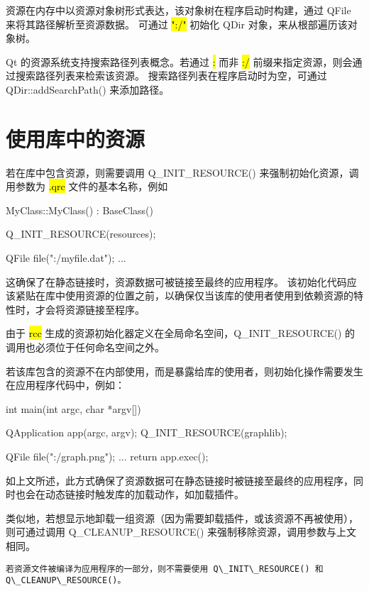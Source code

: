 资源在内存中以资源对象树形式表达，该对象树在程序启动时构建，通过 QFile 来将其路径解析至资源数据。
可通过 \hl{":/"} 初始化 QDir 对象，来从根部遍历该对象树。

Qt 的资源系统支持搜索路径列表概念。若通过 \hl{:} 而非 \hl{:/} 前缀来指定资源，则会通过搜索路径列表来检索该资源。
搜索路径列表在程序启动时为空，可通过 QDir::addSearchPath() 来添加路径。

\section{使用库中的资源}

若在库中包含资源，则需要调用 Q\_INIT\_RESOURCE() 来强制初始化资源，调用参数为 \hl{.qrc} 文件的基本名称，例如

\begin{cppcode}
MyClass::MyClass() : BaseClass()
{
    Q_INIT_RESOURCE(resources);

    QFile file(":/myfile.dat");
    ...
}
\end{cppcode}


这确保了在静态链接时，资源数据可被链接至最终的应用程序。
该初始化代码应该紧贴在库中使用资源的位置之前，以确保仅当该库的使用者使用到依赖资源的特性时，才会将资源链接至程序。

\begin{notice}
由于 \hl{rcc} 生成的资源初始化器定义在全局命名空间，Q\_INIT\_RESOURCE() 的调用也必须位于任何命名空间之外。
\end{notice}

若该库包含的资源不在内部使用，而是暴露给库的使用者，则初始化操作需要发生在应用程序代码中，例如：

\begin{cppcode}
int main(int argc, char *argv[])
{
    QApplication app(argc, argv);
    Q_INIT_RESOURCE(graphlib);
    
    QFile file(":/graph.png");
    ...
    return app.exec();
}    
\end{cppcode}

如上文所述，此方式确保了资源数据可在静态链接时被链接至最终的应用程序，同时也会在动态链接时触发库的加载动作，如加载插件。

类似地，若想显示地卸载一组资源（因为需要卸载插件，或该资源不再被使用），则可通过调用 Q\_CLEANUP\_RESOURCE() 来强制移除资源，调用参数与上文相同。

\begin{lstlisting}
若资源文件被编译为应用程序的一部分，则不需要使用 Q\_INIT\_RESOURCE() 和 Q\_CLEANUP\_RESOURCE()。
\end{lstlisting}
